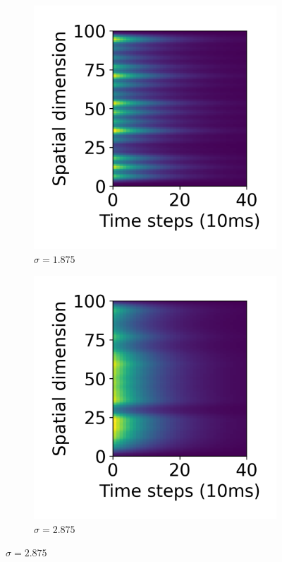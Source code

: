 \documentclass[12pt]{iopart}
\begin{document}
\begin{figure}[h]
	\begin{subfigure}[c]{0.45\textwidth}
		\centering
		\includegraphics[width=\textwidth]{stim_single.png}
		\caption{$\sigma=1.875$}
	\end{subfigure}
	\hfill
	\begin{subfigure}[c]{0.45\textwidth}
		\centering
		\includegraphics[width=\textwidth]{stim_single2.png}
		\caption{$\sigma=2.875$}
	\end{subfigure}


\end{figure}
\end{document}
